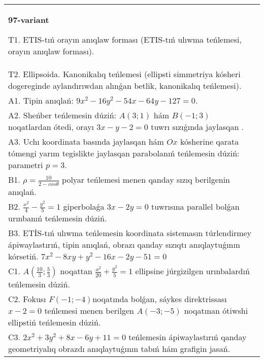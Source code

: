 \documentclass{article}
\begin{document}
\begin{tabular}{m{17cm}}
\textbf{97-variant}
\newline

T1. ETIS-tıń orayın anıqlaw forması (ETIS-tıń ulıwma teńlemesi, orayın anıqlaw forması).\\

T2. Ellipsoida. Kanonikalıq teńlemesi (ellipsti simmetriya kósheri dogereginde aylandırıwdan alınǵan betlik, kanonikalıq teńlemesi).\\

A1. Tipin anıqlań: $9 x^{2}-16 y^{2}-54 x-64 y-127=0$.\\

A2. Sheńber teńlemesin dúziń: $A (3;1) $ hám $B (-1;3) $ noqatlardan ótedi, orayı $3 x-y-2=0$ tuwrı sızıǵında jaylasqan .\\

A3. Uchı koordinata basında jaylasqan hám $Ox$ kósherine qarata tómengi yarım tegislikte jaylasqan parabolanıń teńlemesin dúziń: parametri $p=3$.\\

B1. $\rho = \frac{10}{2 - cos\theta}$ polyar teńlemesi menen qanday sızıq berilgenin anıqlań.  \\

B2. $\frac{x^{2}}{4} - \frac{y^{2}}{5} = 1$ giperbolaǵa $3x - 2y = 0$ tuwrısına parallel bolǵan urınbanıń teńlemesin dúziń.  \\

B3. ETİS-tıń ulıwma teńlemesin koordinata sistemasın túrlendirmey ápiwaylastırıń, tipin anıqlań, obrazı qanday sızıqtı anıqlaytuǵının kórsetiń. $7x^{2} - 8xy + y^{2} - 16x - 2y - 51 = 0$  \\

C1. $A(\frac{10}{3};\frac{5}{3})$ noqattan $\frac{x^{2}}{20} + \frac{y^{2}}{5} = 1$ ellipsine júrgizilgen urınbalardıń teńlemesin dúziń.  \\

C2. Fokusı $F( - 1; - 4)$noqatında bolǵan, sáykes direktrissası $x - 2 = 0$ teńlemesi menen berilgen $A( - 3; - 5)$ noqatınan ótiwshi ellipstiń teńlemesin dúziń.  \\

C3. $2x^{2} + 3y^{2} + 8x - 6y + 11 = 0$ teńlemesin ápiwaylastırıń qanday geometriyalıq obrazdı anıqlaytuǵının tabıń hám grafigin jasań.  \\

\end{tabular}
\vspace{1cm}
\end{document}
